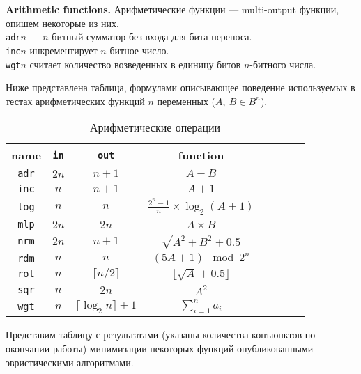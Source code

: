 \documentclass[a4paper,12pt,titlepage,finall]{article}
\begin{document}
{\bf Arithmetic functions.} Арифметические функции --- multi-output функции, опишем некоторые из них.\\
\texttt{adr}$ n $ --- $ n $-битный сумматор без входа для бита переноса.\\
\texttt{inc}$ n $ инкрементирует $ n $-битное число.\\
\texttt{wgt}$ n $ считает количество возведенных в единицу битов $ n $-битного числа.

Ниже представлена таблица, формулами описывающее поведение используемых в тестах арифметических функций $ n $ переменных ($ A,\ B \in B^n $).

\begin{table}[h]
\centering
\begin{tabular}{ |c||c|c||c|c|c|c|c| }
\hline
{\bf name}   & \texttt{\bf in} & \texttt{\bf out}       & {\bf function} \\
\hline\hline
\texttt{adr} & $ 2 n $ & $ n + 1 $                      & $ A + B $ \\
\hline
\texttt{inc} & $ n $   & $ n + 1 $                      & $ A + 1 $ \\
\hline
\texttt{log} & $ n $   & $ n $                          & $ \frac{2^n - 1}{n} \times \log_2 (A + 1) $ \\
\hline
\texttt{mlp} & $ 2 n $ & $ 2 n $                        & $ A \times B $ \\
\hline
\texttt{nrm} & $ 2 n $ & $ n + 1 $                      & $ \sqrt{A^2 + B^2} + 0.5 $ \\
\hline
\texttt{rdm} & $ n $   & $ n $                          & $ (5 A + 1) \mod 2^n $ \\
\hline
\texttt{rot} & $ n $   & $ \lceil n / 2 \rceil $        & $ \lfloor \sqrt{A} + 0.5 \rfloor $ \\
\hline
\texttt{sqr} & $ n $   & $ 2 n $                        & $ A^2 $ \\
\hline
\texttt{wgt} & $ n $   & $ \lceil \log_2 n \rceil + 1 $ & $ \sum\limits_{i = 1}^n a_i $ \\
\hline
\end{tabular}
\caption{Арифметические операции}
\label{table_arithmetic}
\end{table}

Представим таблицу с результатами (указаны количества конъюнктов по окончании работы) минимизации некоторых функций опубликованными эвристическими алгоритмами.
\end{document}
